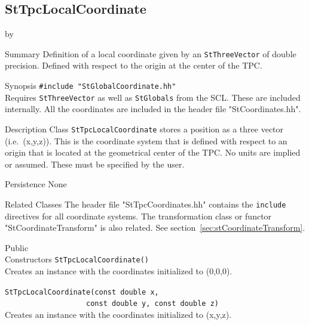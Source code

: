\documentclass[twoside]{article}
\newcommand{\comp}[1]{\texttt{#1}}%
\newcommand{\entrylabel}[1]{\mbox{\textbf{{#1}}}\hfil}%
\newenvironment{entry}
{\begin{list}{}%
    {\renewcommand{\makelabel}{\entrylabel}%
     \setlength{\labelwidth}{90pt}%
     \setlength{\leftmargin}{\labelwidth}
     \advance\leftmargin by \labelsep%
      }%
    }%
  {\end{list}}
\newcommand{\Entrylabel}[1]%
{\raisebox{0pt}[1ex][0pt]{\makebox[\labelwidth][l]%
    {\parbox[t]{\labelwidth}{\hspace{0pt}\textbf{{#1}}}}}}
\newenvironment{Entry}%
{\renewcommand{\entrylabel}{\Entrylabel}\begin{entry}}%
  {\end{entry}}
\begin{document}
%
%
\subsection{StTpcLocalCoordinate} 
\label{sec:stTpcLocalCoordinate}

\begin{Entry}
\item[Summary]
  Definition of a local coordinate given by an \comp{StThreeVector}
  of double precision.  Defined with respect to the origin
  at the center of the TPC.

\item[Synopsis]
  \verb+#include "StGlobalCoordinate.hh"+\\
  Requires \comp{StThreeVector}  as
  well as \comp{StGlobals} from the SCL.   These
  are included internally.  All the coordinates are included
  in the header file "StCoordinates.hh".

\item[Description]
Class \comp{StTpcLocalCoordinate} stores a position as a three vector (i.e.~(x,y,z)).
This is the coordinate system that is defined with respect to an
origin that is located at the geometrical center of the TPC.
No units are implied or assumed.  These must be specified by the user.

\item[Persistence]
   None

\item[Related Classes]
The header file "StTpcCoordinates.hh" contains the \texttt{include}
directives for all coordinate systems.  The transformation class or
functor "StCoordinateTransform" is also related.  See 
section~\ref{sec:stCoordinateTransform}.

\item[Public \\ Constructors]
   \verb+StTpcLocalCoordinate()+\\
   Creates an instance with the coordinates initialized to (0,0,0).

   \verb+StTpcLocalCoordinate(const double x,+\\
   \verb+                   const double y, const double z)+\\
   Creates an instance with the coordinates initialized to (x,y,z).


\end{Entry}
\end{document}
